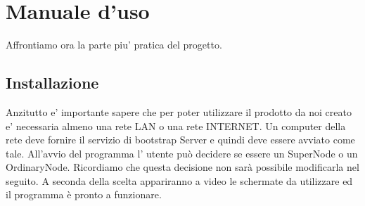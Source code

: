 \chapter{Manuale d'uso}
Affrontiamo ora la parte piu' pratica del progetto.
\section{Installazione}
Anzitutto e' importante sapere che per poter utilizzare il prodotto da noi creato e' necessaria almeno una rete LAN o una rete INTERNET.
Un computer della rete deve fornire il servizio di bootstrap Server e quindi deve essere avviato come tale.
All'avvio del programma l' utente può decidere se essere un SuperNode o un OrdinaryNode.
Ricordiamo che questa decisione non sarà possibile modificarla nel seguito. 
A seconda della scelta appariranno a video le schermate da utilizzare ed il programma è pronto a funzionare.
